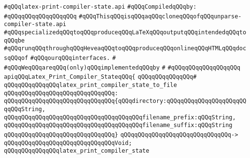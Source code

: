 \label{src/lib/compiler/front/typer-stuff/symbolmapstack/latex-print-compiler-state.api}
\verb|#qQQqlatex-print-compiler-state.api|\newline
\newline
\verb|#qQQqCompiledqQQqby:|\newline
\verb|#qQQqqQQqqQQqqQQqqQQq|\newline
\newline
\verb|#qQQqThisqQQqisqQQqaqQQqcloneqQQqofqQQqunparse-compiler-state.api|\newline
\verb|#qQQqspecializedqQQqtoqQQqproduceqQQqLaTeXqQQqoutputqQQqintendedqQQqtoqQQqbe|\newline
\verb|#qQQqrunqQQqthroughqQQqHeveaqQQqtoqQQqproduceqQQqonlineqQQqHTMLqQQqdocsqQQqof|\newline
\verb|#qQQqourqQQqinterfaces.|\newline
\verb|#|\newline
\verb|#qQQqWeqQQqareqQQq(only)qQQqimplementedqQQqby|\newline
\verb|#|\newline
\verb|#qQQqqQQqqQQqqQQqqQQq|\newline
\newline
\verb|apiqQQqLatex_Print_Compiler_StateqQQq{|\newline
\verb|qQQqqQQqqQQqqQQq#|\newline
\verb|qQQqqQQqqQQqqQQqlatex_print_compiler_state_to_file|\newline
\verb|qQQqqQQqqQQqqQQqqQQqqQQqqQQqqQQq:|\newline
\verb|qQQqqQQqqQQqqQQqqQQqqQQqqQQqqQQq{qQQqdirectory:qQQqqQQqqQQqqQQqqQQqqQQqqQQqString,|\newline
\verb|qQQqqQQqqQQqqQQqqQQqqQQqqQQqqQQqqQQqqQQqfilename_prefix:qQQqString,|\newline
\verb|qQQqqQQqqQQqqQQqqQQqqQQqqQQqqQQqqQQqqQQqfilename_suffix:qQQqString|\newline
\verb|qQQqqQQqqQQqqQQqqQQqqQQqqQQqqQQq}|\newline
\verb|qQQqqQQqqQQqqQQqqQQqqQQqqQQqqQQq->|\newline
\verb|qQQqqQQqqQQqqQQqqQQqqQQqqQQqqQQqVoid;|\newline
\newline
\verb|qQQqqQQqqQQqqQQqlatex_print_compiler_state|\newline
